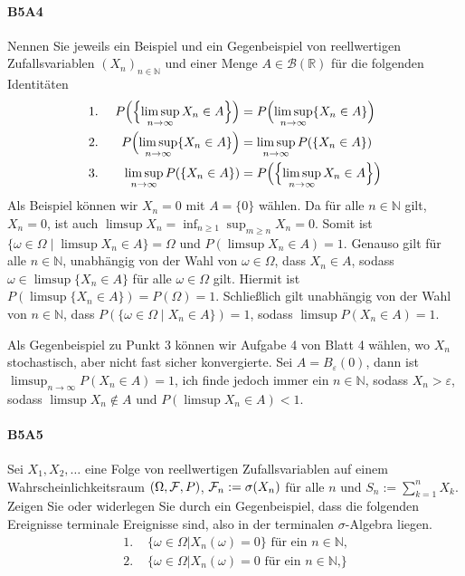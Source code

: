 \documentclass{article}
\begin{document}
\paragraph{B5A4}
Nennen Sie jeweils ein Beispiel und ein Gegenbeispiel von reellwertigen Zufallsvariablen $(X_n)_{n\in\mathbb{N}}$ und einer Menge $A\in\mathcal{B}(\mathbb{R})$ für die folgenden Identitäten
  \begin{alignat*}{2}
&\text{1.~}&P\Bigl(\Bigl\{\limsup_{n\to\infty}X_n\in A\Bigr\}\Bigr)&=P\Bigl(\limsup_{n\to\infty}\{X_n\in A\}\Bigr)\\
&\text{2.~}&P\Bigl(\limsup_{n\to\infty}\{X_n\in A\}\Bigr)&=\limsup_{n\to\infty}P(\{X_n\in A\})\\
&\text{3.~}&\limsup_{n\to\infty}P(\{X_n\in A\})&=P\Bigl(\Bigl\{\limsup_{n\to\infty}X_n\in A\Bigr\}\Bigr)
\end{alignat*}
Als Beispiel können wir $X_n=0$ mit $A=\{0\}$ wählen.
Da für alle $n\in\mathbb{N}$ gilt, $X_n=0$, ist auch $\limsup X_n=\inf_{n\geq1}\sup_{m\geq n} X_n=0$.
Somit ist $\{\omega\in\Omega\mid\limsup X_n\in A\}=\Omega$ und $P(\limsup X_n\in A)=1$.
Genauso gilt für alle $n\in\mathbb{N}$, unabhängig von der Wahl von $\omega\in\Omega$, dass $X_n\in A$, sodass $\omega\in\limsup\{ X_n\in A\}$ für alle $\omega\in\Omega$ gilt.
Hiermit ist $P(\limsup\{X_n\in A\})=P(\Omega)=1$.
Schließlich gilt unabhängig von der Wahl von $n\in\mathbb{N}$, dass $P(\{\omega\in\Omega\mid X_n\in A\})=1$, sodass
$\limsup P(X_n\in A)=1$.

Als Gegenbeispiel zu Punkt 3 können wir Aufgabe 4 von Blatt 4 wählen, wo $X_n$ stochastisch, aber nicht fast sicher konvergierte.
Sei $A=B_\varepsilon(0)$, dann ist $\limsup_{n\to\infty}P(X_n\in A)=1$, ich finde jedoch immer ein $n\in\mathbb{N}$, sodass $X_n>\varepsilon$, sodass $\limsup X_n\notin A$ und $P(\limsup X_n\in A)<1$.
\newpage

\paragraph{B5A5}
Sei $X_1,X_2,\dots$ eine Folge von reellwertigen Zufallsvariablen auf einem Wahrscheinlichkeitsraum $(\Omega,{\cal F},P)$, ${\cal F}_n:=\sigma(X_n)$ für alle $n$ und $S_n:=\sum_{k=1}^nX_k$.
Zeigen Sie oder widerlegen Sie durch ein Gegenbeispiel, dass die folgenden Ereignisse terminale Ereignisse sind, also in der terminalen $\sigma$-Algebra liegen.
\begin{align*}
  \text{1.~}&\{\omega\in\Omega|X_n(\omega)=0\}\text{ für ein $n\in\mathbb{N}$,}\\
  \text{2.~}&\{\omega\in\Omega|X_n(\omega)=0\text{ für ein $n\in\mathbb{N}$,}\}
\end{align*}
\newpage


\end{document}
